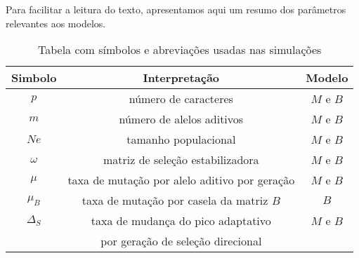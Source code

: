 Para facilitar a leitura do texto, apresentamos aqui um resumo dos
parâmetros relevantes aos modelos.

\begin{table}[htbp]
    \caption[Tabela de abreviações]{Tabela com símbolos e abreviações
    usadas nas simulações}
    \label{tab:exemplo}
    \vspace{1em}
    \centering
    \begin{tabular}{c c c}
        \toprule
        Simbolo    & Interpretação & Modelo\\
        \midrule
        $p$        & número de caracteres & $M$ e $B$\\
        $m$        & número de alelos aditivos & $M$ e $B$\\
        $Ne$       & tamanho populacional & $M$ e $B$   \\
        $\omega$   & matriz de seleção estabilizadora & $M$ e $B$\\
        $\mu$      & taxa de mutação por alelo aditivo por geração & $M$ e $B$\\
        $\mu_B$    & taxa de mutação por casela da matriz $B$ & $B$\\
        $\Delta_S$ & taxa de mudança do pico adaptativo & $M$ e $B$\\
                   & por geração de seleção direcional & \\

        \bottomrule
    \end{tabular}
\end{table}
